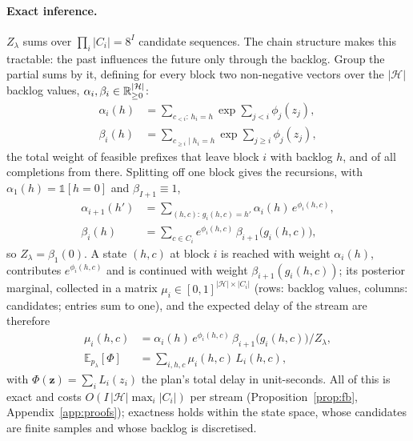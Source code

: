 \paragraph{Exact inference.} $Z_\lambda$ sums over $\prod_i|C_i|=8^I$ candidate sequences. The chain structure makes
this tractable: the past influences the future only through the backlog. Group the partial sums by it, defining for
every block two non-negative vectors over the $|\mathcal{H}|$ backlog values,
$\alpha_i,\beta_i\in\mathbb{R}_{\ge0}^{|\mathcal{H}|}$:
\begin{equation}
\begin{aligned}
\alpha_i(h)&=\textstyle\sum_{c_{<i}:\,h_i=h}\exp\sum_{j<i}\phi_j(z_j),\\
\beta_i(h)&=\textstyle\sum_{c_{\ge i}\mid h_i=h}\exp\sum_{j\ge i}\phi_j(z_j),
\end{aligned}
\label{eq:msg}
\end{equation}
the total weight of feasible prefixes that leave block $i$ with backlog $h$, and of all completions from there.
Splitting off one block gives the recursions, with $\alpha_1(h)=\mathds{1}[h=0]$ and $\beta_{I+1}\equiv1$,
\begin{equation}
\begin{aligned}
\alpha_{i+1}(h')&=\textstyle\sum_{(h,c):\,g_i(h,c)=h'}\alpha_i(h)\,e^{\phi_i(h,c)},\\
\beta_i(h)&=\textstyle\sum_{c\in C_i}e^{\phi_i(h,c)}\,\beta_{i+1}\big(g_i(h,c)\big),
\end{aligned}
\label{eq:fb}
\end{equation}
so $Z_\lambda=\beta_1(0)$. A state $(h,c)$ at block $i$ is reached with weight $\alpha_i(h)$, contributes
$e^{\phi_i(h,c)}$ and is continued with weight $\beta_{i+1}(g_i(h,c))$; its posterior marginal, collected in a matrix
$\mu_i\in[0,1]^{|\mathcal{H}|\times|C_i|}$ (rows: backlog values, columns: candidates; entries sum to one), and the
expected delay of the stream are therefore
\begin{equation}
\begin{aligned}
\mu_i(h,c)&=\alpha_i(h)\,e^{\phi_i(h,c)}\,\beta_{i+1}\big(g_i(h,c)\big)/Z_\lambda,\\
\mathbb{E}_{p_\lambda}[\Phi]&=\textstyle\sum_{i,h,c}\mu_i(h,c)\,L_i(h,c),
\end{aligned}
\label{eq:marg}
\end{equation}
with $\Phi(\bm{z})=\sum_iL_i(z_i)$ the plan's total delay in unit-seconds. All of this is exact and costs
$O(I\,|\mathcal{H}|\max_i|C_i|)$ per stream (Proposition~\ref{prop:fb}, Appendix~\ref{app:proofs}); exactness holds
within the state space, whose candidates are finite samples and whose backlog is discretised.

